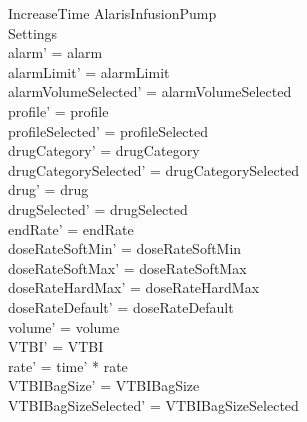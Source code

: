 \begin{schema}{IncreaseTime}
	\Delta AlarisInfusionPump\\
	 Settings\\
	\where
	alarm' = alarm\\
	alarmLimit' = alarmLimit\\
	alarmVolumeSelected' = alarmVolumeSelected\\
	profile' = profile\\
	profileSelected' = profileSelected\\
	drugCategory' = drugCategory\\ 
	\pagebreak
	drugCategorySelected' = drugCategorySelected\\
	drug' = drug\\ 
	drugSelected' = drugSelected\\
	endRate' = endRate\\
	doseRateSoftMin' = doseRateSoftMin\\
	doseRateSoftMax' = doseRateSoftMax\\
	doseRateHardMax' = doseRateHardMax\\
	doseRateDefault' = doseRateDefault\\
	volume' = volume\\
	VTBI' = VTBI\\
	rate' = time' * rate\\
	VTBIBagSize' = VTBIBagSize\\ 
	VTBIBagSizeSelected' = VTBIBagSizeSelected\\

\end{schema}
